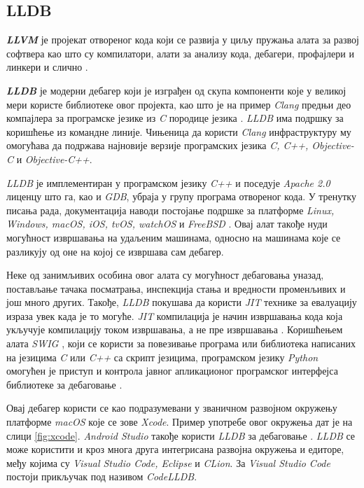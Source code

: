 \documentclass[a4paper]{article}
\begin{document}
\subsection{LLDB}

\textbf{\em LLVM} је пројекат отвореног кода који се развија у циљу 
пружања алата за развој софтвера као што су компилатори, алати
за анализу кода, дебагери, профајлери и линкери и слично \cite{llvm}.

\textbf{\em LLDB} је модерни дебагер који је изграђен од скупа
компоненти које у великој мери користе библиотеке овог пројекта,
као што је на пример {\em Clang} предњи део компајлера за програмске
језике из {\em C} породице језика \cite{lldb}.
{\em LLDB} има подршку за коришћење из командне линије. Чињеница да
користи {\em Clang} инфраструктуру му омогућава да подржава најновије
верзије програмских језика {\em C, C++, Objective-C} и {\em Objective-C++}.

{\em LLDB} је имплементиран у програмском језику {\em C++} и поседује
{\em Apache 2.0} лиценцу што га, као и {\em GDB}, убраја у групу 
програма отвореног кода. У тренутку писања рада, документација 
наводи постојање подршке за платформе {\em Linux, Windows, macOS, iOS, 
tvOS, watchOS} и {\em FreeBSD} \cite{lldb}. Овај алат такође нуди могућност
извршавања на удаљеним машинама, односно на машинама које се разликују
од оне на којој се извршава сам дебагер.

Неке од занимљивих особина овог алата су могућност дебаговања уназад,
постављање тачака посматрања, инспекција стања и вредности променљивих 
и још много других. Такође, {\em LLDB} покушава да користи {\em JIT} 
технике за евалуацију израза увек када је то могуће. {\em JIT} компилација
је начин извршавања кода која укључује компилацију током извршавања, а не
пре извршавања \cite[Chapter~10]{jit}.
Коришћењем алата {\em SWIG} \cite{swig}, који се користи
за повезивање програма или библиотека написаних на језицима {\em C} или
{\em C++} са скрипт језицима, програмском језику {\em Python} омогућен је
приступ и контрола јавног апликационог програмског интерфејса библиотеке 
за дебаговање \cite{lldb}.

Овај дебагер користи се као подразумевани у званичном развојном окружењу
платформе {\em macOS} које се зове {\em Xcode}. Пример употребе овог окружења
дат је на слици \ref{fig:xcode}. {\em Android Studio} такође 
користи {\em LLDB} за дебаговање \cite{android}. {\em LLDB} се може користити
и кроз многа друга интегрисана развојна окружења и едиторе, међу којима су {\em Visual
Studio Code, Eclipse} и {\em CLion}. За {\em Visual Studio Code} постоји 
прикључак под називом {\em CodeLLDB}.
\end{document}
